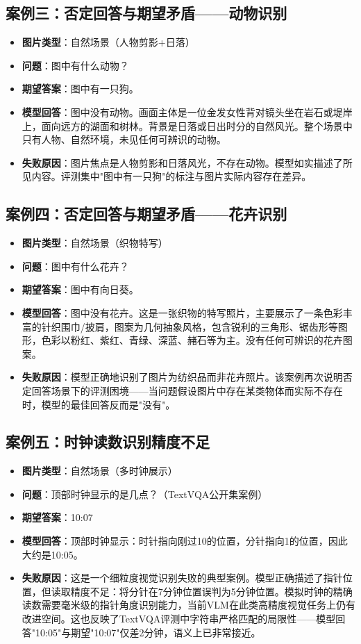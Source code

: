 \subsection{案例三：否定回答与期望矛盾——动物识别}

\begin{itemize}
  \item \textbf{图片类型}：自然场景（人物剪影+日落）
  \item \textbf{问题}：图中有什么动物？
  \item \textbf{期望答案}：图中有一只狗。
  \item \textbf{模型回答}：图中没有动物。画面主体是一位金发女性背对镜头坐在岩石或堤岸上，面向远方的湖面和树林。背景是日落或日出时分的自然风光。整个场景中只有人物、自然环境，未见任何可辨识的动物。
  \item \textbf{失败原因}：图片焦点是人物剪影和日落风光，不存在动物。模型如实描述了所见内容。评测集中"图中有一只狗"的标注与图片实际内容存在差异。
\end{itemize}

\subsection{案例四：否定回答与期望矛盾——花卉识别}

\begin{itemize}
  \item \textbf{图片类型}：自然场景（织物特写）
  \item \textbf{问题}：图中有什么花卉？
  \item \textbf{期望答案}：图中有向日葵。
  \item \textbf{模型回答}：图中没有花卉。这是一张织物的特写照片，主要展示了一条色彩丰富的针织围巾/披肩，图案为几何抽象风格，包含锐利的三角形、锯齿形等图形，色彩以粉红、紫红、青绿、深蓝、赭石等为主。没有任何可辨识的花卉图案。
  \item \textbf{失败原因}：模型正确地识别了图片为纺织品而非花卉照片。该案例再次说明否定回答场景下的评测困境——当问题假设图片中存在某类物体而实际不存在时，模型的最佳回答反而是"没有"。
\end{itemize}

\subsection{案例五：时钟读数识别精度不足}

\begin{itemize}
  \item \textbf{图片类型}：自然场景（多时钟展示）
  \item \textbf{问题}：顶部时钟显示的是几点？（TextVQA公开集案例）
  \item \textbf{期望答案}：10:07
  \item \textbf{模型回答}：顶部时钟显示：时针指向刚过10的位置，分针指向1的位置，因此大约是10:05。
  \item \textbf{失败原因}：这是一个细粒度视觉识别失败的典型案例。模型正确描述了指针位置，但读取精度不足：将分针在7分钟位置误判为5分钟位置。模拟时钟的精确读数需要毫米级的指针角度识别能力，当前VLM在此类高精度视觉任务上仍有改进空间。这也反映了TextVQA评测中字符串严格匹配的局限性——模型回答"10:05"与期望"10:07"仅差2分钟，语义上已非常接近。
\end{itemize}

